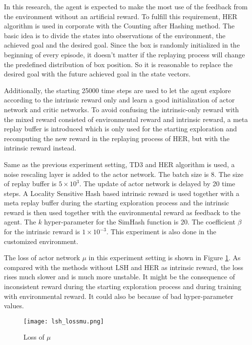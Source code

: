 \documentclass[a4paper, 12pt]{report}
\begin{document}
    In this research, the agent is expected to make the most use of the feedback from the environment without an artificial reward. To fulfill this requirement, HER algorithm is used in corporate with the Counting after Hashing method. The basic idea is to divide the states into observations of the environment, the achieved goal and the desired goal. Since the box is randomly initialized in the beginning of every episode, it doesn't matter if the replaying process will change the predefined distribution of box position. So it is reasonable to replace the desired goal with the future achieved goal in the state vectors. 

    Additionally, the starting 25000 time steps are used to let the agent explore according to the intrinsic reward only and learn a good initialization of actor network and critic networks. To avoid confusing the intrinsic-only reward with the mixed reward consisted of environmental reward and intrinsic reward, a meta replay buffer is introduced which is only used for the starting exploration and recomputing the new reward in the replaying process of HER, but with the intrinsic reward instead.

    Same as the previous experiment setting, TD3 and HER algorithm is used, a noise rescaling layer is added to the actor network. The batch size is 8. The size of replay buffer is $5\times 10^3$. The update of actor network is delayed by 20 time steps. A Locality Sensitive Hash based intrinsic reward is used together with a meta replay buffer during the starting exploration process and the intrinsic reward is then used together with the environmental reward as feedback to the agent. The $k$ hyper-parameter for the SimHash function is 20. The coefficient $\beta$ for the intrinsic reward is $1\times 10^{-3}$. This experiment is also done in the customized environment.

    The loss of actor network $\mu$ in this experiment setting is shown in Figure \ref{lsh_lossmu}. As compared with the methods without LSH and HER as intrinsic reward, the loss rises much slower and is much more unstable. It might be the consequence of inconsistent reward during the starting exploration process and during training with environmental reward. It could also be because of bad hyper-parameter values. 

        \begin{figure}[H]
        \centering
        \texttt{[image: lsh\_lossmu.png]}
        \caption{Loss of $\mu$}
            \label{lsh_lossmu}
        \end{figure}
\end{document}
